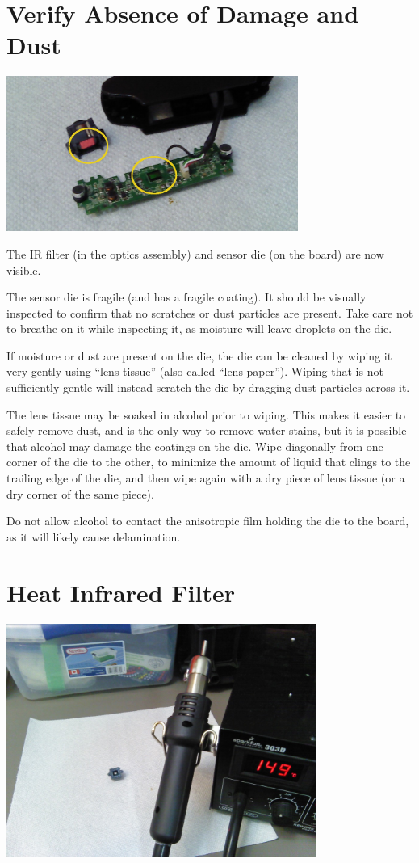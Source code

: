 \section{Verify Absence of Damage and Dust}

\includegraphics[height=2in]{pics-c920/09-filterdie.jpg}

The IR filter (in the optics assembly) and sensor die (on the board) are now
visible.

The sensor die is fragile (and has a fragile coating). It should be visually
inspected to confirm that no scratches or dust particles are present. Take
care not to breathe on it while inspecting it, as moisture will leave droplets
on the die.

If moisture or dust are present on the die, the die can be cleaned by wiping
it very gently using ``lens tissue'' (also called ``lens paper''). Wiping that
is not sufficiently gentle will instead scratch the die by dragging dust
particles across it.

The lens tissue may be soaked in alcohol prior to wiping. This makes it
easier to safely remove dust, and is the only way to remove water stains,
but it is possible that alcohol may damage the coatings on the die. Wipe
diagonally from one corner of the die to the other, to minimize the amount
of liquid that clings to the trailing edge of the die, and then wipe again
with a dry piece of lens tissue (or a dry corner of the same piece).

Do not allow alcohol to contact the anisotropic film holding the die to the
board, as it will likely cause delamination.

\section{Heat Infrared Filter}

\includegraphics[height=3in]{pics-c920/10-heatgun.jpg}

